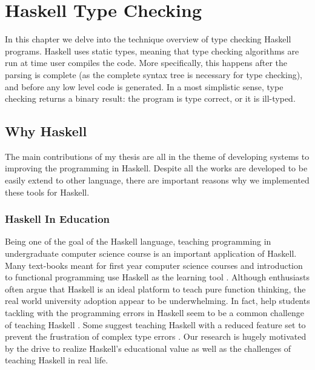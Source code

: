 
\chapter{Haskell Type Checking} %

\label{chap:haskell-type-checking}

\graphicspath{{Figures/HaskellTypeChecking}}
In this chapter we delve into the technique overview of type checking Haskell programs. Haskell uses static types, meaning that type checking algorithms are run at time user compiles the code. More specifically, this happens after the parsing is complete (as the complete syntax tree is necessary for type checking), and before any low level code is generated. In a most simplistic sense, type checking returns a binary result: the program is type correct, or it is ill-typed.

\section{Why Haskell}

The main contributions of my thesis are all in the theme of developing systems to improving the programming in Haskell. Despite all the works are developed to be easily extend to other language, there are important reasons why we implemented these tools for Haskell.

\subsection{Haskell In Education}

Being one of the goal of the  Haskell language, teaching programming in undergraduate computer science course is an important application of Haskell.  Many text-books meant for first year computer science courses and introduction to functional programming use Haskell as the learning tool \cite{Bird1998-kv, Davie1992-xv}. Although enthusiasts often argue that Haskell is an ideal platform to teach pure function thinking, the real world university adoption appear to be underwhelming. In fact, help students tackling with the programming errors in Haskell seem to be a common challenge of teaching Haskell \cite{Jun2000-yu, Tirronen2015-nr}. Some suggest teaching Haskell with a reduced feature set to prevent the frustration of complex type errors \cite{Heeren2003-mz}. Our research is hugely motivated by the drive to realize Haskell's educational value as well as the challenges of teaching Haskell in real life.

